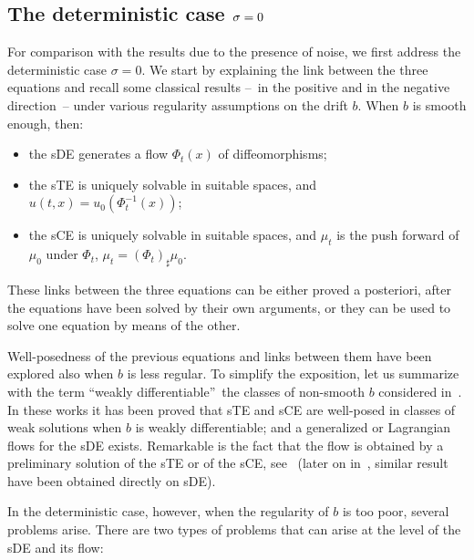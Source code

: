 \documentclass[a4paper,10pt]{article}
\begin{document}
\subsection{The deterministic case $\protect\sigma=0$}\label{subsection
deterministic}

For comparison with the results due to the presence of noise, we first
address the deterministic case $\sigma=0$. We start by explaining the link
between the three equations and recall some classical results --~in the
positive and in the negative direction~-- under various regularity
assumptions on the drift $b$. When $b$ is smooth enough, then:
\begin{itemize}
  \item[i)] the sDE generates a flow $\Phi_{t}(x)$ of diffeomorphisms;
  \item[ii)] the sTE is uniquely solvable in suitable spaces, and $u(
  t,x) =u_{0}(\Phi_{t}^{-1}(x) )$;
  \item[iii)] the sCE is uniquely solvable in suitable spaces, and $\mu_{t}$
  is the push forward of $\mu_{0}$ under $\Phi_{t}$, $\mu_{t}=(\Phi
  _{t}) _{\sharp}\mu_{0}$.
\end{itemize}
These links between the three equations can be either proved a posteriori,
after the equations have been solved by their own arguments, or they can be
used to solve one equation by means of the other.

Well-posedness of the previous equations and links between them have been
explored also when $b$ is less regular. To simplify the exposition, let us
summarize with the term \textquotedblleft weakly
differentiable\textquotedblright\ the classes of non-smooth $b$ considered
in~\cite{DIPELI89,AMBROSIO04}. In these works it has been proved
that sTE and sCE are well-posed in classes of weak solutions when $b$ is
weakly differentiable; and a generalized or Lagrangian flows for the sDE
exists. Remarkable is the fact that the flow is obtained by a preliminary
solution of the sTE or of the sCE, see~\cite{DIPELI89,AMBROSIO04}
(later on in~\cite{CrDeL}, similar result have been obtained directly on
sDE).

In the deterministic case, however, when the regularity of $b$ is too poor,
several problems arise. There are two types of problems that can arise at
the level of the sDE and its flow:
\end{document}
